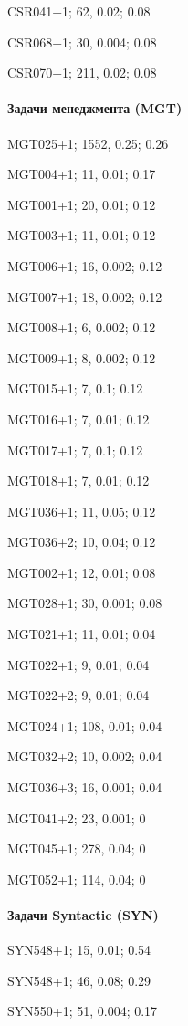 CSR041+1; 62, 0.02; 0.08

CSR068+1; 30, 0.004; 0.08

CSR070+1; 211, 0.02; 0.08

\paragraph{Задачи менеджмента (MGT)}

MGT025+1; 1552, 0.25; 0.26

MGT004+1; 11, 0.01; 0.17

MGT001+1; 20, 0.01; 0.12

MGT003+1; 11, 0.01; 0.12

MGT006+1; 16, 0.002; 0.12

MGT007+1; 18, 0.002; 0.12

MGT008+1; 6, 0.002; 0.12

MGT009+1; 8, 0.002; 0.12

MGT015+1; 7, 0.1; 0.12

MGT016+1; 7, 0.01; 0.12

MGT017+1; 7, 0.1; 0.12

MGT018+1; 7, 0.01; 0.12

MGT036+1; 11, 0.05; 0.12

MGT036+2; 10, 0.04; 0.12

MGT002+1; 12, 0.01; 0.08

MGT028+1; 30, 0.001; 0.08

MGT021+1; 11, 0.01; 0.04

MGT022+1; 9, 0.01; 0.04

MGT022+2; 9, 0.01; 0.04

MGT024+1; 108, 0.01; 0.04

MGT032+2; 10, 0.002; 0.04

MGT036+3; 16, 0.001; 0.04



MGT041+2; 23, 0.001; 0

MGT045+1; 278, 0.04; 0

MGT052+1; 114, 0.04; 0


\paragraph{Задачи Syntactic (SYN)}

SYN548+1; 15, 0.01; 0.54

SYN548+1; 46, 0.08; 0.29

SYN550+1; 51, 0.004; 0.17

